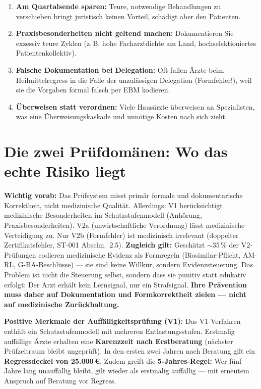 \documentclass[a4paper]{umbruch-position}
\begin{document}
\begin{enumerate}
    \item \textbf{Am Quartalsende sparen:} Teure, notwendige Behandlungen zu verschieben bringt juristisch keinen Vorteil, sch\"adigt aber den Patienten.
    \item \textbf{Praxisbesonderheiten nicht geltend machen:} Dokumentieren Sie exzessiv teure Zyklen (z.\,B. hohe Facharztdichte am Land, hochselektioniertes Patientenkollektiv).
    \item \textbf{Falsche Dokumentation bei Delegation:} Oft fallen \"Arzte beim Heilmittelregress in die Falle der unzul\"assigen Delegation (Formfehler!), weil sie die Vorgaben formal falsch per EBM kodieren.
    \item \textbf{\"Uberweisen statt verordnen:} Viele Haus\"arzte \"uberweisen an Spezialisten, was eine \"Uberweisungskaskade und unn\"otige Kosten nach sich zieht.
\end{enumerate}

\section{Die zwei Pr\"ufdom\"anen: Wo das echte Risiko liegt}

\textbf{Wichtig vorab:} Das Pr\"ufsystem misst prim\"ar formale und dokumentarische Korrektheit, nicht medizinische Qualit\"at. Allerdings: V1 ber\"ucksichtigt medizinische Besonderheiten im Schutzstufenmodell (Anh\"orung, Praxisbesonderheiten). V2a (unwirtschaftliche Verordnung) l\"asst medizinische Verteidigung zu. Nur V2b (Formfehler) ist medizinisch irrelevant (doppelter Zertifikatsfehler, ST-001 Abschn.~2.5). \textbf{Zugleich gilt:} Gesch\"atzt ${\sim}$35\,\% der V2-Pr\"ufungen codieren medizinische Evidenz als Formregeln (Biosimilar-Pflicht, AM-RL, G-BA-Beschl\"usse) --- sie sind keine Willk\"ur, sondern Evidenzsteuerung. Das Problem ist nicht die Steuerung selbst, sondern dass sie punitiv statt edukativ erfolgt: Der Arzt erh\"alt kein Lernsignal, nur ein Strafsignal. \textbf{Ihre Pr\"avention muss daher auf Dokumentation und Formkorrektheit zielen --- nicht auf medizinische Zur\"uckhaltung.}

\textbf{Positive Merkmale der Auff\"alligkeitspr\"ufung (V1):} Das V1-Verfahren enth\"alt ein Schutzstufenmodell mit mehreren Entlastungsstufen. Erstmalig auff\"allige \"Arzte erhalten eine \textbf{Karenzzeit nach Erstberatung} (n\"achster Pr\"ufzeitraum bleibt ungepr\"uft). In den ersten zwei Jahren nach Beratung gilt ein \textbf{Regressdeckel von 25.000\,\euro{}}. Zudem greift die \textbf{5-Jahres-Regel:} Wer f\"unf Jahre lang unauff\"allig bleibt, gilt wieder als erstmalig auff\"allig --- mit erneutem Anspruch auf Beratung vor Regress.
\end{document}
